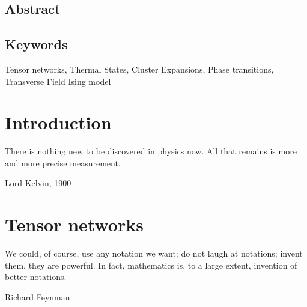 \documentclass{book}
\newcounter{a}
\newcounter{b}
\begin{document}
\section*{Abstract}



\section*{Keywords}

Tensor networks, Thermal States, Cluster Expansions, Phase transitions, Transverse Field Ising model

\newpage




\setcounter{tocdepth}{3}
\tableofcontents

\newpage


\printglossary[type=\acronymtype,nonumberlist,nogroupskip]




\mainmatter


\chapter{Introduction}\label{chap1}

\epigraph{There is nothing new to be discovered in physics now. All that remains is more and more precise measurement.}{Lord Kelvin, 1900}



\chapter{Tensor networks}\label{chap2}

\epigraph{We could, of course, use any notation we want; do not laugh at notations; invent them, they are powerful. In fact, mathematics is, to a large extent, invention of better notations.}{Richard Feynman}
\end{document}
